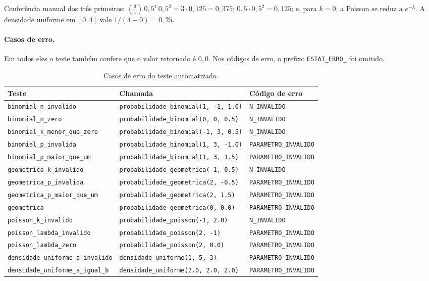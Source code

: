 \documentclass[12pt,a4paper]{article}
\newcommand{\cod}[1]{\texttt{#1}}
\begin{document}
Conferência manual dos três primeiros: $\binom{3}{1}\,0{,}5^{1}\,0{,}5^{2} = 3 \cdot 0{,}125 = 0{,}375$;
$0{,}5 \cdot 0{,}5^{2} = 0{,}125$; e, para $k = 0$, a Poisson se reduz a $e^{-\lambda}$.
A densidade uniforme em $[0, 4]$ vale $1/(4-0) = 0{,}25$.

\paragraph{Casos de erro.} Em todos eles o teste também confere que o valor
retornado é $0{,}0$. Nos códigos de erro, o prefixo \cod{ESTAT\_ERRO\_} foi
omitido.
\begin{table}[h]
\centering
\footnotesize
\begin{tabular}{@{}lll@{}}
\toprule
Teste & Chamada & Código de erro \\
\midrule
\scriptsize\cod{binomial\_n\_invalido}            & \cod{probabilidade\_binomial(1, -1, 1.0)} & \cod{N\_INVALIDO} \\
\scriptsize\cod{binomial\_n\_zero}                & \cod{probabilidade\_binomial(0, 0, 0.5)}  & \cod{N\_INVALIDO} \\
\scriptsize\cod{binomial\_k\_menor\_que\_zero}    & \cod{probabilidade\_binomial(-1, 3, 0.5)} & \cod{N\_INVALIDO} \\
\scriptsize\cod{binomial\_p\_invalida}            & \cod{probabilidade\_binomial(1, 3, -1.0)} & \cod{PARAMETRO\_INVALIDO} \\
\scriptsize\cod{binomial\_p\_maior\_que\_um}      & \cod{probabilidade\_binomial(1, 3, 1.5)}  & \cod{PARAMETRO\_INVALIDO} \\
\scriptsize\cod{geometrica\_k\_invalido}          & \cod{probabilidade\_geometrica(-1, 0.5)}  & \cod{N\_INVALIDO} \\
\scriptsize\cod{geometrica\_p\_invalida}          & \cod{probabilidade\_geometrica(2, -0.5)}  & \cod{PARAMETRO\_INVALIDO} \\
\scriptsize\cod{geometrica\_p\_maior\_que\_um}    & \cod{probabilidade\_geometrica(2, 1.5)}   & \cod{PARAMETRO\_INVALIDO} \\
\scriptsize\cod{geometrica}                       & \cod{probabilidade\_geometrica(0, 0.0)}   & \cod{PARAMETRO\_INVALIDO} \\
\scriptsize\cod{poisson\_k\_invalido}             & \cod{probabilidade\_poisson(-1, 2.0)}     & \cod{N\_INVALIDO} \\
\scriptsize\cod{poisson\_lambda\_invalido}        & \cod{probabilidade\_poisson(2, -1)}       & \cod{PARAMETRO\_INVALIDO} \\
\scriptsize\cod{poisson\_lambda\_zero}            & \cod{probabilidade\_poisson(2, 0.0)}      & \cod{PARAMETRO\_INVALIDO} \\
\scriptsize\cod{densidade\_uniforme\_a\_invalido} & \cod{densidade\_uniforme(1, 5, 3)}        & \cod{PARAMETRO\_INVALIDO} \\
\scriptsize\cod{densidade\_uniforme\_a\_igual\_b} & \cod{densidade\_uniforme(2.0, 2.0, 2.0)}  & \cod{PARAMETRO\_INVALIDO} \\
\bottomrule
\end{tabular}
\caption{Casos de erro do teste automatizado.}
\end{table}
\end{document}
